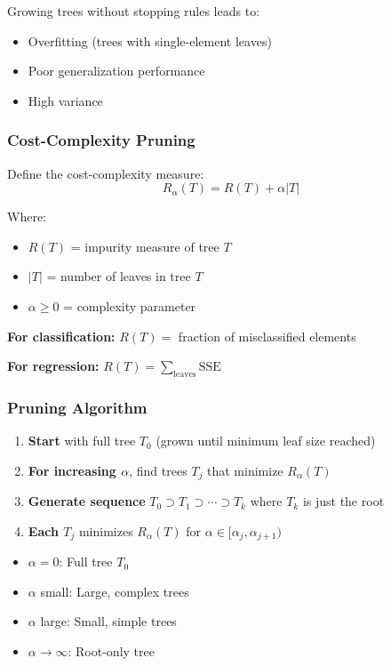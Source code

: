 \documentclass[12pt,a4paper]{article}
\begin{document}
Growing trees without stopping rules leads to:
\begin{itemize}
    \item Overfitting (trees with single-element leaves)
    \item Poor generalization performance
    \item High variance
\end{itemize}

\subsubsection{Cost-Complexity Pruning}

Define the cost-complexity measure:
\begin{equation}
R_\alpha(T) = R(T) + \alpha |T|
\end{equation}

Where:
\begin{itemize}
    \item $R(T)$ = impurity measure of tree $T$
    \item $|T|$ = number of leaves in tree $T$
    \item $\alpha \geq 0$ = complexity parameter
\end{itemize}

\textbf{For classification:} $R(T) = $ fraction of misclassified elements

\textbf{For regression:} $R(T) = \sum_{\text{leaves}} \text{SSE}$

\subsubsection{Pruning Algorithm}

\begin{enumerate}
    \item \textbf{Start} with full tree $T_0$ (grown until minimum leaf size reached)
    \item \textbf{For increasing $\alpha$}, find trees $T_j$ that minimize $R_\alpha(T)$
    \item \textbf{Generate sequence} $T_0 \supset T_1 \supset \cdots \supset T_k$ where $T_k$ is just the root
    \item \textbf{Each $T_j$} minimizes $R_\alpha(T)$ for $\alpha \in [\alpha_j, \alpha_{j+1})$
\end{enumerate}

\begin{tcolorbox}[colback=yellow!5!white,colframe=orange!75!black,title=Complexity Parameter Effects]
\begin{itemize}
    \item $\alpha = 0$: Full tree $T_0$
    \item $\alpha$ small: Large, complex trees
    \item $\alpha$ large: Small, simple trees
    \item $\alpha \to \infty$: Root-only tree
\end{itemize}
\end{tcolorbox}
\end{document}
